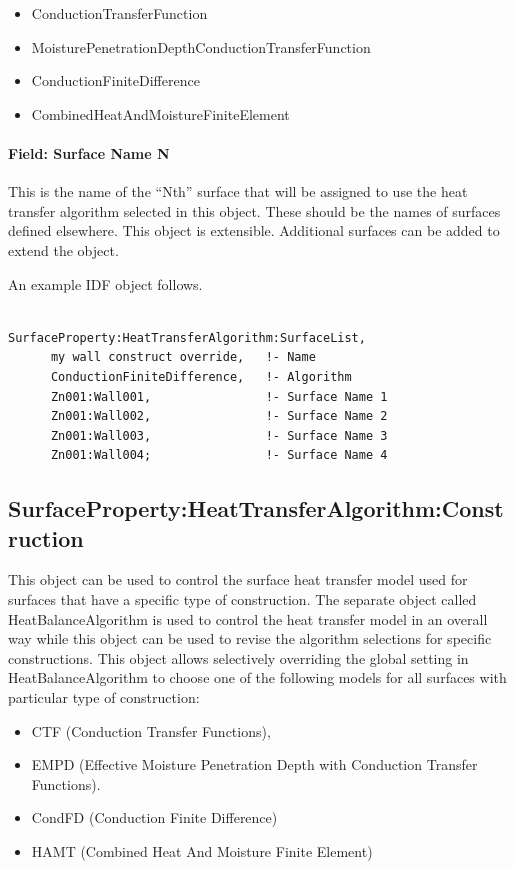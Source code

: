 \begin{itemize}
\item
  ConductionTransferFunction
\item
  MoisturePenetrationDepthConductionTransferFunction
\item
  ConductionFiniteDifference
\item
  CombinedHeatAndMoistureFiniteElement
\end{itemize}

\paragraph{Field: Surface Name N}\label{field-surface-name-n}

This is the name of the ``Nth'' surface that will be assigned to use the heat transfer algorithm selected in this object. These should be the names of surfaces defined elsewhere. This object is extensible. Additional surfaces can be added to extend the object.

An example IDF object follows.

\begin{lstlisting}

SurfaceProperty:HeatTransferAlgorithm:SurfaceList,
      my wall construct override,   !- Name
      ConductionFiniteDifference,   !- Algorithm
      Zn001:Wall001,                !- Surface Name 1
      Zn001:Wall002,                !- Surface Name 2
      Zn001:Wall003,                !- Surface Name 3
      Zn001:Wall004;                !- Surface Name 4
\end{lstlisting}

\subsection{SurfaceProperty:HeatTransferAlgorithm:Construction}\label{surfacepropertyheattransferalgorithmconstruction}

This object can be used to control the surface heat transfer model used for surfaces that have a specific type of construction. The separate object called HeatBalanceAlgorithm is used to control the heat transfer model in an overall way while this object can be used to revise the algorithm selections for specific constructions. This object allows selectively overriding the global setting in HeatBalanceAlgorithm to choose one of the following models for all surfaces with particular type of construction:

\begin{itemize}
\item
  CTF (Conduction Transfer Functions),
\item
  EMPD (Effective Moisture Penetration Depth with Conduction Transfer Functions).
\item
  CondFD (Conduction Finite Difference)
\item
  HAMT (Combined Heat And Moisture Finite Element)
\end{itemize}

